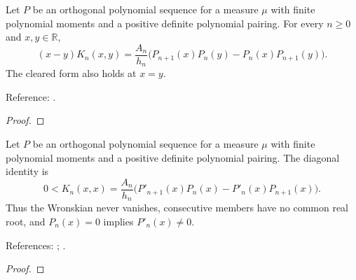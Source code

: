 \begin{theorem}
\label{thm:general-cd}
\leanok
Let $P$ be an orthogonal polynomial sequence for a measure $\mu$ with finite polynomial moments and a positive definite polynomial pairing. For every $n\ge0$ and $x,y\in\mathbb R$,
\[
 (x-y)K_n(x,y)=\frac{A_n}{h_n}
  \bigl(P_{n+1}(x)P_n(y)-P_n(x)P_{n+1}(y)\bigr).
\]
The cleared form also holds at $x=y$.

Reference: \cite[18.2.12]{dlmf}.
\end{theorem}
\begin{proof}
\leanok
\end{proof}

\begin{theorem}
\label{thm:general-cd-diag}
\leanok
Let $P$ be an orthogonal polynomial sequence for a measure $\mu$ with finite polynomial moments and a positive definite polynomial pairing.
The diagonal identity is
\[
 0<K_n(x,x)=\frac{A_n}{h_n}
   \bigl(P'_{n+1}(x)P_n(x)-P'_n(x)P_{n+1}(x)\bigr).
\]
Thus the Wronskian never vanishes, consecutive members have no common real
root, and $P_n(x)=0$ implies $P'_n(x)\ne0$.

References: \cite[18.2.13]{dlmf}; \cite[Chapter 3]{szego}.
\end{theorem}
\begin{proof}
\leanok
\end{proof}

